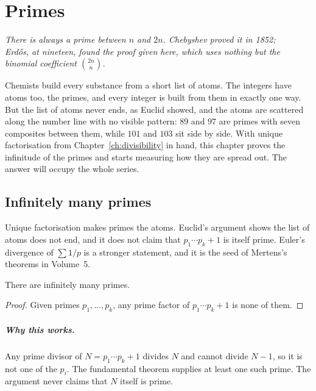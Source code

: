 \chapter{Primes}\label{ch:primes}

\begin{center}\itshape
There is always a prime between $n$ and $2n$. Chebyshev proved it in 1852;\\
Erd\H{o}s, at nineteen, found the proof given here, which uses nothing but the binomial coefficient $\binom{2n}n$.
\end{center}

Chemists build every substance from a short list of atoms. The integers have atoms too, the primes, and every integer is built from them in exactly
one way. But the list of atoms never ends, as Euclid showed, and the atoms are scattered along the number line with no visible pattern: $89$ and $97$
are primes with seven composites between them, while $101$ and $103$ sit side by side. With unique factorisation from Chapter~\ref{ch:divisibility} in hand, this chapter proves the infinitude of the primes and starts measuring how they are spread out. The answer will occupy the whole series.


\section{Infinitely many primes}

Unique factorisation makes primes the atoms. Euclid's argument shows the list of atoms does not end, and it does not claim that $p_1\cdots p_k+1$ is itself prime. Euler's divergence of $\sum 1/p$ is a stronger statement, and it is the seed of Mertens's theorems in Volume~5.

\begin{theorem}[Euclid]
There are infinitely many primes.
\end{theorem}
\begin{proof}
Given primes $p_1,\dots,p_k$, any prime factor of $p_1\cdots p_k+1$ is none of them.
\end{proof}

\paragraph{Why this works.}
Any prime divisor of $N=p_1\cdots p_k+1$ divides $N$ and cannot divide $N-1$, so it is not one of the $p_i$. The fundamental theorem supplies at least one such prime. The argument never claims that $N$ itself is prime.

